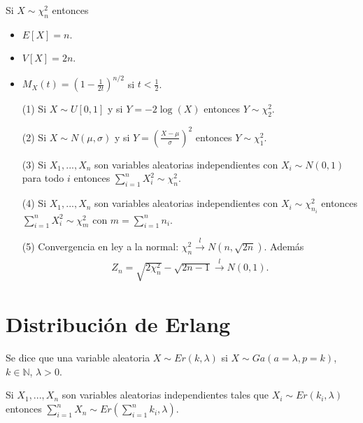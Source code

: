 \begin{obs}
    Si $X \sim \chi_n^2$ entonces
    \begin{itemize}
        \item $E[X] = n$.
        \item $V[X] = 2n$.
        \item $M_X(t) = \left( 1 - \frac{1}{2t} \right)^{n/2}$ si $t < \frac{1}{2}$.
    \end{itemize}
\end{obs}

\begin{prop}
    \begin{enumerate}
        \item[(1)] Si $X \sim U[0,1]$ y si $Y = -2\log(X)$ entonces $Y \sim \chi_2^2$.
        \item[(2)] Si $X \sim N(\mu, \sigma)$ y si $Y = \left( \frac{X - \mu}{\sigma}\right)^2$ entonces $Y \sim \chi_1^2$.
        \item[(3)] Si $X_1,...,X_n$ son variables aleatorias independientes con $X_i \sim N(0,1)$ para todo $i$ entonces $\sum_{i=1}^{n}{X_i^2} \sim \chi_n^2$.
        \item[(4)] Si $X_1,...,X_n$ son variables aleatorias independientes con $X_i \sim \chi_{n_i}^2$ entonces $\sum_{i=1}^{n}{X_i^2} \sim \chi_m^2$ con $m = \sum_{i=1}^{n}{n_i}$.
        \item[(5)] Convergencia en ley a la normal: $\chi_n^2 \xrightarrow[]{ \ \ l \ \ } N(n, \sqrt{2n})$. Además
              \begin{align*}
                  Z_n= \sqrt{2\chi_n^2} - \sqrt{2n -1} \xrightarrow[]{ \ \ l \ \ } N(0,1).
              \end{align*}
    \end{enumerate}
\end{prop}

\section{Distribución de Erlang}

\begin{defi}
    Se dice que una variable aleatoria $X \sim Er(k, \lambda)$ si $X \sim Ga(a = \lambda, p = k)$, $k \in \mathbb{N}$, $\lambda > 0$.
\end{defi}

\begin{obs}
    Si $X_1, ..., X_n$ son variables aleatorias independientes tales que $X_i \sim Er(k_i, \lambda)$ entonces
    $\sum_{i=1}^{n}{X_n} \sim Er\left( \sum_{i=1}^{n}{k_i}, \lambda\right)$.
\end{obs}

